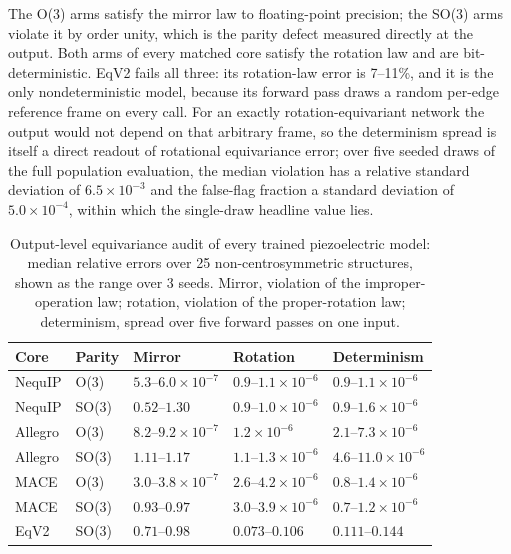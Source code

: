 The O(3) arms satisfy the mirror law to floating-point precision; the SO(3) arms violate it by order unity, which is the parity defect measured directly at the output. Both arms of every matched core satisfy the rotation law and are bit-deterministic. EqV2 fails all three: its rotation-law error is 7--11\%, and it is the only nondeterministic model, because its forward pass draws a random per-edge reference frame on every call. For an exactly rotation-equivariant network the output would not depend on that arbitrary frame, so the determinism spread is itself a direct readout of rotational equivariance error; over five seeded draws of the full population evaluation, the median violation has a relative standard deviation of $6.5\times10^{-3}$ and the false-flag fraction a standard deviation of $5.0\times10^{-4}$, within which the single-draw headline value lies.

\begin{table}[htbp]
\centering
\caption{Output-level equivariance audit of every trained piezoelectric model: median relative errors over 25 non-centrosymmetric structures, shown as the range over 3 seeds. Mirror, violation of the improper-operation law; rotation, violation of the proper-rotation law; determinism, spread over five forward passes on one input.}
\label{stab:eqv2audit}
\centering
\fontsize{7bp}{8.5bp}\selectfont
\begin{tabular*}{\textwidth}{@{\extracolsep{\fill}}lllll}
\toprule
Core & Parity & Mirror & Rotation & Determinism \\
\midrule
NequIP & O(3) & $5.3$--$6.0\times10^{-7}$ & $0.9$--$1.1\times10^{-6}$ & $0.9$--$1.1\times10^{-6}$ \\
NequIP & SO(3) & $0.52$--$1.30$ & $0.9$--$1.0\times10^{-6}$ & $0.9$--$1.6\times10^{-6}$ \\
Allegro & O(3) & $8.2$--$9.2\times10^{-7}$ & $1.2\times10^{-6}$ & $2.1$--$7.3\times10^{-6}$ \\
Allegro & SO(3) & $1.11$--$1.17$ & $1.1$--$1.3\times10^{-6}$ & $4.6$--$11.0\times10^{-6}$ \\
MACE & O(3) & $3.0$--$3.8\times10^{-7}$ & $2.6$--$4.2\times10^{-6}$ & $0.8$--$1.4\times10^{-6}$ \\
MACE & SO(3) & $0.93$--$0.97$ & $3.0$--$3.9\times10^{-6}$ & $0.7$--$1.2\times10^{-6}$ \\
EqV2 & SO(3) & $0.71$--$0.98$ & $0.073$--$0.106$ & $0.111$--$0.144$ \\
\bottomrule
\end{tabular*}
\end{table}

